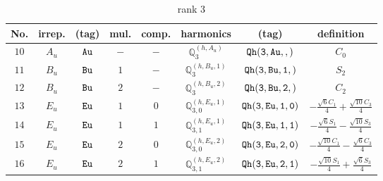\documentclass[fleqn,8pt]{jsarticle}
\begin{document}
\begin{table}[ht!]
\begin{center}
\caption{rank 3}
\renewcommand{\arraystretch}{1.3}
\begin{tabular}{cccccccc} \hline \hline
No. & irrep. & (tag) & mul. & comp. & harmonics & (tag) & definition \\ \hline
$ 10 $ & $ A_{u} $ & $ {\tt Au} $ & $ - $ & $ - $ & $ \mathbb{Q}_{3}^{(h,A_{u})} $ & $ {\tt Qh(3,Au,,)} $ & $ C_{0} $ \\
$ 11 $ & $ B_{u} $ & $ {\tt Bu} $ & $ 1 $ & $ - $ & $ \mathbb{Q}_{3}^{(h,B_{u},1)} $ & $ {\tt Qh(3,Bu,1,)} $ & $ S_{2} $ \\
$ 12 $ & $ B_{u} $ & $ {\tt Bu} $ & $ 2 $ & $ - $ & $ \mathbb{Q}_{3}^{(h,B_{u},2)} $ & $ {\tt Qh(3,Bu,2,)} $ & $ C_{2} $ \\
$ 13 $ & $ E_{u} $ & $ {\tt Eu} $ & $ 1 $ & $ 0 $ & $ \mathbb{Q}_{3,0}^{(h,E_{u},1)} $ & $ {\tt Qh(3,Eu,1,0)} $ & $ - \frac{\sqrt{6} C_{1}}{4} + \frac{\sqrt{10} C_{3}}{4} $ \\
$ 14 $ & $ E_{u} $ & $ {\tt Eu} $ & $ 1 $ & $ 1 $ & $ \mathbb{Q}_{3,1}^{(h,E_{u},1)} $ & $ {\tt Qh(3,Eu,1,1)} $ & $ - \frac{\sqrt{6} S_{1}}{4} - \frac{\sqrt{10} S_{3}}{4} $ \\
$ 15 $ & $ E_{u} $ & $ {\tt Eu} $ & $ 2 $ & $ 0 $ & $ \mathbb{Q}_{3,0}^{(h,E_{u},2)} $ & $ {\tt Qh(3,Eu,2,0)} $ & $ - \frac{\sqrt{10} C_{1}}{4} - \frac{\sqrt{6} C_{3}}{4} $ \\
$ 16 $ & $ E_{u} $ & $ {\tt Eu} $ & $ 2 $ & $ 1 $ & $ \mathbb{Q}_{3,1}^{(h,E_{u},2)} $ & $ {\tt Qh(3,Eu,2,1)} $ & $ - \frac{\sqrt{10} S_{1}}{4} + \frac{\sqrt{6} S_{3}}{4} $ \\
 \hline \hline
\end{tabular}
\end{center}
\end{table}
\end{document}
